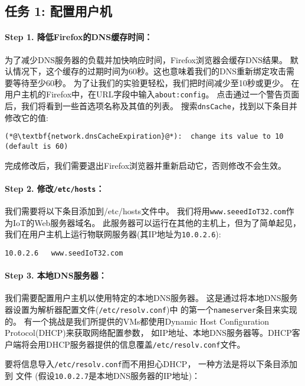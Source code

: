 \subsection{任务 1: 配置用户机}

\paragraph{Step 1. 降低Firefox的DNS缓存时间：}
为了减少DNS服务器的负载并加快响应时间，Firefox浏览器会缓存DNS结果。
默认情况下，这个缓存的过期时间为60秒。这也意味着我们的DNS重新绑定攻击需要等待至少60秒。
为了让我们的实验更轻松，我们把时间减少至10秒或更少。
在用户主机的Firefox中，在URL字段中输入\texttt{about:config}。
点击通过一个警告页面后，我们将看到一些首选项名称及其值的列表。
搜索\texttt{dnsCache}，找到以下条目并修改它的值:


\begin{lstlisting}
(*@\textbf{network.dnsCacheExpiration}@*):  change its value to 10 (default is 60)
\end{lstlisting}

完成修改后，我们需要退出Firefox浏览器并重新启动它，否则修改不会生效。



\paragraph{Step 2. 修改\texttt{/etc/hosts}：}

我们需要将以下条目添加到/etc/hosts文件中。
我们将用\texttt{www.seeedIoT32.com}作为IoT的Web服务器域名。
此服务器可以运行在其他的主机上，但为了简单起见，
我们在用户主机上运行物联网服务器(其IP地址为\texttt{10.0.2.6}):


\begin{lstlisting}
10.0.2.6   www.seedIoT32.com
\end{lstlisting}
 


\paragraph{Step 3. 本地DNS服务器：}
我们需要配置用户主机以使用特定的本地DNS服务器。
这是通过将本地DNS服务器设置为解析器配置文件(\texttt{/etc/resolv.conf})中
的第一个\texttt{nameserver}条目来实现的。
有一个挑战是我们所提供的VMs都使用Dynamic Host Configuration Protocol(DHCP)来获取网络配置参数，
如IP地址、本地DNS服务器等。DHCP客户端将会用DHCP服务器提供的信息覆盖\texttt{/etc/resolv.conf}文件。

要将信息导入\texttt{/etc/resolv.conf}而不用担心DHCP，
一种方法是将以下条目添加到 文件
(假设\texttt{10.0.2.7}是本地DNS服务器的IP地址)：


